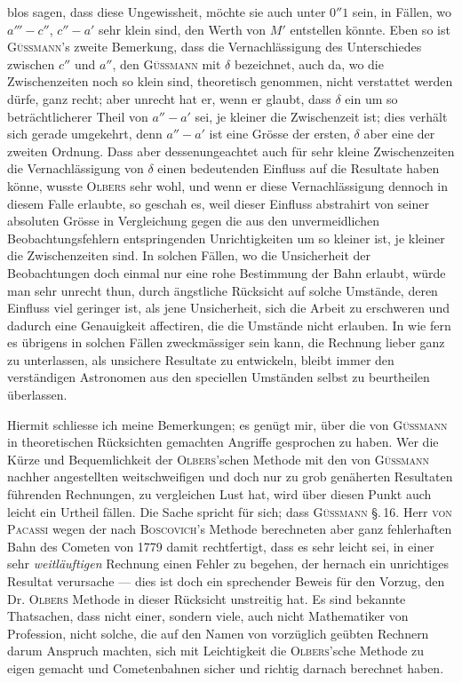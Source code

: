 blos sagen, dass diese Ungewissheit, möchte sie auch unter $0''1$ sein, in Fällen, wo $a'''\!-c''$, $c''\!-a'$ sehr klein sind, den Werth von $M'$ entstellen könnte. Eben so ist \textsc{Güssmann}'s zweite Bemerkung, dass die Vernachlässigung des Unterschiedes zwischen $c''$ und $a''$, den \textsc{Güssmann} mit $\delta$ bezeichnet, auch da, wo die Zwischenzeiten noch so klein sind, theoretisch genommen, nicht verstattet werden dürfe, ganz recht; aber unrecht hat er, wenn er glaubt, dass $\delta$ ein um so beträchtlicherer Theil von $a''\!-a'$ sei, je kleiner die Zwischenzeit ist; dies verhält sich gerade umgekehrt, denn $a''\!-a'$ ist eine Grösse der ersten, $\delta$ aber eine der zweiten Ordnung. Dass aber dessenungeachtet auch für sehr kleine Zwischenzeiten die Vernachlässigung von $\delta$ einen bedeutenden Einfluss auf die Resultate haben könne, wusste \textsc{Olbers} sehr wohl, und wenn er diese Vernachlässigung dennoch in diesem Falle erlaubte, so geschah es, weil dieser Einfluss abstrahirt von seiner absoluten Grösse in Vergleichung gegen die aus den unvermeidlichen Beobachtungsfehlern entspringenden Unrichtigkeiten um so kleiner ist, je kleiner die Zwischenzeiten sind. In solchen Fällen, wo die Unsicherheit der Beobachtungen doch einmal nur eine rohe Bestimmung der Bahn erlaubt, würde man sehr unrecht thun, durch ängstliche Rücksicht auf solche Umstände, deren Einfluss viel geringer ist, als jene Unsicherheit, sich die Arbeit zu erschweren und dadurch eine Genauigkeit affectiren, die die Umstände nicht erlauben. In wie fern es übrigens in solchen Fällen zweckmässiger sein kann, die Rechnung lieber ganz zu unterlassen, als unsichere Resultate zu entwickeln, bleibt immer den verständigen Astronomen aus den speciellen Umständen selbst zu beurtheilen überlassen.

Hiermit schliesse ich meine Bemerkungen; es genügt mir, über die von \textsc{Güssmann} in theoretischen Rücksichten gemachten Angriffe gesprochen zu haben. Wer die Kürze und Bequemlichkeit der \textsc{Olbers}'schen Methode mit den von \textsc{Güssmann} nachher angestellten weitschweifigen und doch nur zu grob genäherten Resultaten führenden Rechnungen, zu vergleichen Lust hat, wird über diesen Punkt auch leicht ein Urtheil fällen. Die Sache spricht für sich; dass \textsc{Güssmann} \S.\,16. Herr \textsc{von Pacassi} wegen der nach \textsc{Boscovich}'s Methode berechneten aber ganz fehlerhaften Bahn des Cometen von 1779 damit rechtfertigt, dass es sehr leicht sei, in einer sehr \emph{weitläuftigen} Rechnung einen Fehler zu begehen, der hernach ein unrichtiges Resultat verursache --- dies ist doch ein sprechender Beweis für den Vorzug, den Dr. \textsc{Olbers} Methode in dieser Rücksicht unstreitig hat. Es sind bekannte Thatsachen, dass nicht einer, sondern viele, auch nicht Mathematiker von Profession, nicht solche, die auf den Namen von vorzüglich geübten Rechnern darum Anspruch machten, sich mit Leichtigkeit die \textsc{Olbers}'sche Methode zu eigen gemacht und Cometenbahnen sicher und richtig darnach berechnet haben.
